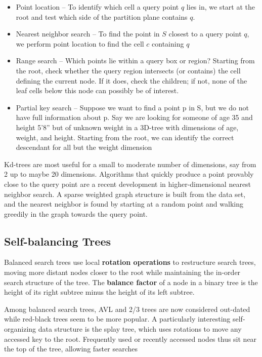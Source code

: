 \documentclass{article}
\begin{document}
    \begin{itemize}
        \item Point location – To identify which cell a query point $q$ lies in, we start at the root and test which side of the partition plane contains $q$. 
        
        \item Nearest neighbor search – To find the point in $S$ closest to a query point $q$, we perform point location to find the cell $c$ containing $q$
        
        \item Range search – Which points lie within a query box or region? Starting from the root, check whether the query region intersects (or contains) the cell defining the current node. If it does, check the children; if not, none of the leaf cells below this node can possibly be of interest.
        
        \item Partial key search – Suppose we want to find a point p in S, but we do not have full information about p. Say we are looking for someone of age 35 and height 5’8” but of unknown weight in a 3D-tree with dimensions of age, weight, and height. Starting from the root, we can identify the correct descendant for all but the weight dimension
    \end{itemize}
    
    Kd-trees are most useful for a small to moderate number of dimensions, say from 2 up to maybe 20 dimensions. Algorithms that quickly produce a point provably close to the query point are a recent development in higher-dimensional nearest neighbor search. A sparse weighted graph structure is built from the data set, and the nearest neighbor is found by starting at a random point and walking greedily in the graph towards the query point.

    \subsection{Self-balancing Trees}
    Balanced search trees use local \textbf{rotation operations} to restructure search trees, moving more distant nodes closer to the root while maintaining the in-order search structure of the tree. The \textbf{balance factor} of a node in a binary tree is the height of its right subtree minus the height of its left subtree. 
    
    Among balanced search trees, AVL and 2/3 trees are now considered out-dated while red-black trees seem to be more popular. A particularly interesting self-organizing data structure is the splay tree, which uses rotations to move any accessed key to the root. Frequently used or recently accessed nodes thus sit near the top of the tree, allowing faster searches 
    
\end{document}

